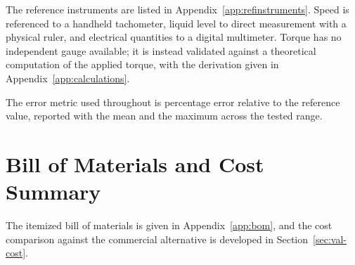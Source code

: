 
The reference instruments are listed in Appendix~\ref{app:refinstruments}. Speed is referenced to a handheld tachometer, liquid level to direct measurement with a physical ruler, and electrical quantities to a digital multimeter. Torque has no independent gauge available; it is instead validated against a theoretical computation of the applied torque, with the derivation given in Appendix~\ref{app:calculations}.

The error metric used throughout is percentage error relative to the reference value, reported with the mean and the maximum across the tested range.


\section{Bill of Materials and Cost Summary}
\label{sec:arch-bom}


The itemized bill of materials is given in Appendix~\ref{app:bom}, and the cost comparison against the commercial alternative is developed in Section~\ref{sec:val-cost}.